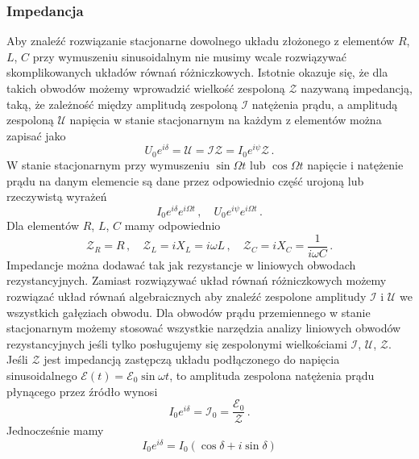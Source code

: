 \documentclass[../main.tex]{subfiles}
\begin{document}
\subsubsection{Impedancja}
Aby znaleźć rozwiązanie stacjonarne dowolnego układu złożonego z elementów \(R\), \(L\), \(C\) przy
wymuszeniu sinusoidalnym nie musimy wcale rozwiązywać skomplikowanych układów równań różniczkowych.
Istotnie okazuje się, że dla takich obwodów możemy wprowadzić wielkość zespoloną \(\mathcal{Z}\)
nazywaną impedancją, taką, że zależność między amplitudą zespoloną \(\mathcal{I}\) natężenia prądu,
a amplitudą zespoloną \(\mathcal{U}\) napięcia w stanie stacjonarnym na każdym z elementów można
zapisać jako
\begin{equation*}
    U_0e^{i \delta}=\mathcal{U}=\mathcal{IZ}=I_0e^{i \psi}\mathcal{Z}\,.
\end{equation*}
W stanie stacjonarnym przy wymuszeniu \(\sin\Omega t\) lub \(\cos\Omega t\) napięcie i natężenie
prądu na danym elemencie są dane przez odpowiednio część urojoną lub rzeczywistą wyrażeń
\begin{equation*}
    I_0e^{i\delta}e^{i\Omega t}\,,\quad U_0e^{i\psi}e^{i\Omega t}\,.
\end{equation*}
Dla elementów \(R\), \(L\), \(C\) mamy odpowiednio
\begin{equation*}
    \mathcal{Z}_R=R\,,\quad \mathcal{Z}_L=iX_L=i\omega L\,,\quad \mathcal{Z}_C=iX_C=\frac{1}{i\omega C}\,.
\end{equation*}
Impedancje można dodawać tak jak rezystancje w liniowych obwodach rezystancyjnych. Zamiast
rozwiązywać układ równań różniczkowych możemy rozwiązać układ równań algebraicznych aby znaleźć
zespolone amplitudy \(\mathcal{I}\) i \(\mathcal{U}\) we wszystkich gałęziach obwodu. Dla obwodów
prądu przemiennego w stanie stacjonarnym możemy stosować wszystkie narzędzia analizy liniowych
obwodów rezystancyjnych jeśli tylko posługujemy się zespolonymi wielkościami \(\mathcal{I}\),
\(\mathcal{U}\), \(\mathcal{Z}\). Jeśli \(\mathcal{Z}\) jest impedancją zastępczą układu
podłączonego do napięcia sinusoidalnego \(\mathcal{E}(t)=\mathcal{E}_0\sin\omega t\), to amplituda
zespolona natężenia prądu płynącego przez źródło wynosi
\begin{equation*}
    I_0e^{i\delta}=\mathcal{I}_0=\frac{\mathcal{E}_0}{\mathcal{Z}}\,.
\end{equation*}
Jednocześnie mamy
\begin{equation*}
    I_0e^{i\delta}=I_0(\cos\delta+i\sin\delta)
\end{equation*}
\end{document}

